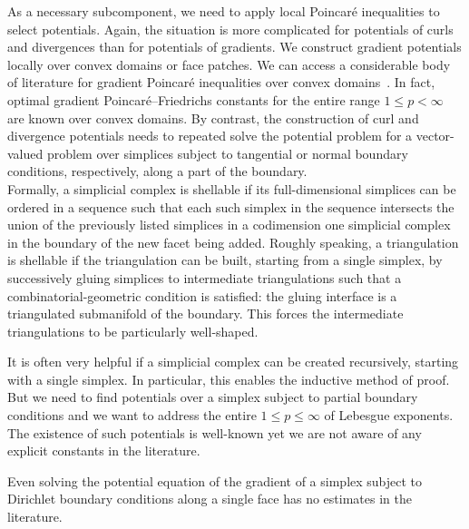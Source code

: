 \documentclass[a4paper]{article}
\begin{document}
As a necessary subcomponent, we need to apply local Poincar\'e inequalities to select potentials. 
Again, the situation is more complicated for potentials of curls and divergences than for potentials of gradients. 
We construct gradient potentials locally over convex domains or face patches. 
We can access a considerable body of literature for gradient Poincar\'e inequalities over convex domains~\cite{bebendorf2003note}. In fact, optimal gradient Poincar\'e--Friedrichs constants for the entire range $1 \leq p < \infty$ are known over convex domains. 
By contrast, the construction of curl and divergence potentials needs to repeated solve the potential problem for a vector-valued problem over simplices subject to tangential or normal boundary conditions, respectively, along a part of the boundary.
\\




Formally, a simplicial complex is shellable if its full-dimensional simplices can be ordered in a sequence such that each such simplex in the sequence intersects the union of the previously listed simplices in a codimension one simplicial complex in the boundary of the new facet being added. 
Roughly speaking, a triangulation is shellable if the triangulation can be built, starting from a single simplex,
by successively gluing simplices to intermediate triangulations such that a combinatorial-geometric condition is satisfied:
the gluing interface is a triangulated submanifold of the boundary. 
This forces the intermediate triangulations to be particularly well-shaped. 

It is often very helpful if a simplicial complex can be created recursively, starting with a single simplex. 
In particular, this enables the inductive method of proof.
\\


But we need to find potentials over a simplex subject to partial boundary conditions 
and we want to address the entire $1 \leq p \leq \infty$ of Lebesgue exponents. 
The existence of such potentials is well-known yet we are not aware of any explicit constants in the literature.


Even solving the potential equation of the gradient of a simplex subject to Dirichlet boundary conditions along a single face 
has no estimates in the literature. 
\end{document}
